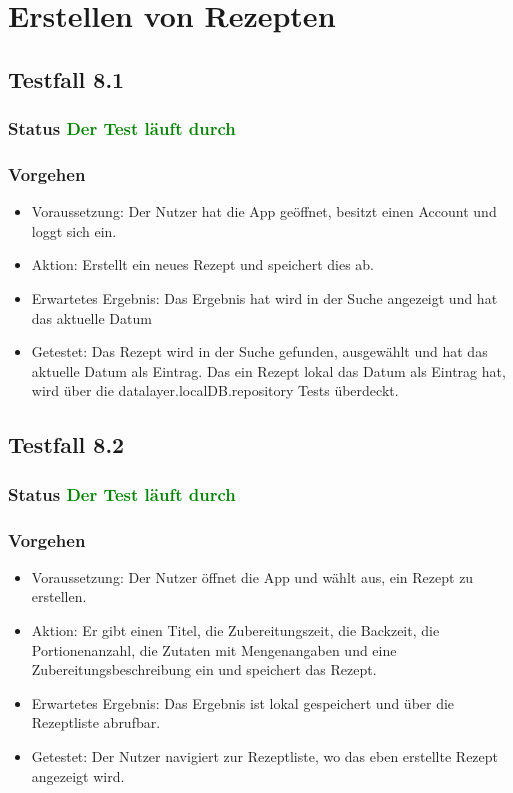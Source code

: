 \section{Erstellen von Rezepten}

\subsection{Testfall 8.1}
\subsubsection{Status \textcolor{green}{ Der Test läuft durch}} 
\subsubsection{Vorgehen}
\begin{itemize}
\item Voraussetzung: Der Nutzer hat die App geöffnet, besitzt einen Account und loggt sich ein.
\item Aktion:  Erstellt ein neues Rezept und speichert dies ab.
\item Erwartetes Ergebnis: Das Ergebnis hat wird in der Suche angezeigt und hat das aktuelle Datum
\item Getestet: Das Rezept wird in der Suche gefunden, ausgewählt und hat das aktuelle Datum als Eintrag. Das ein Rezept lokal das Datum als Eintrag hat, wird über die datalayer.localDB.repository Tests überdeckt. 
\end{itemize}


\subsection{Testfall 8.2}
\subsubsection{Status \textcolor{green}{ Der Test läuft durch} }
\subsubsection{Vorgehen}
\begin{itemize}
\item Voraussetzung: Der Nutzer öffnet die App und wählt aus, ein Rezept zu erstellen.  
\item Aktion: Er gibt einen Titel, die Zubereitungszeit, die Backzeit, die Portionenanzahl, die Zutaten mit Mengenangaben  und eine Zubereitungsbeschreibung ein und speichert das Rezept.
\item Erwartetes Ergebnis: Das Ergebnis ist lokal gespeichert und über die Rezeptliste abrufbar. 
\item Getestet: Der Nutzer navigiert zur Rezeptliste, wo das eben erstellte Rezept angezeigt wird. 
\end{itemize}


